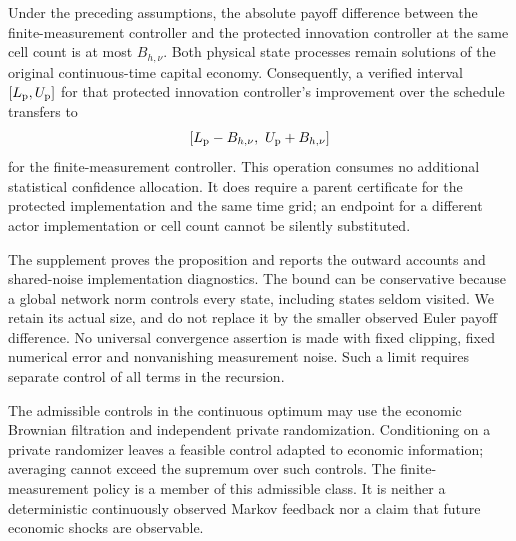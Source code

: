 \begin{proposition}\label{prop:r13sensor}
Under the preceding assumptions, the absolute payoff difference between the finite-measurement controller and the protected innovation controller at the same cell count is at most $B_{h,\nu}$. Both physical state processes remain solutions of the original continuous-time capital economy. Consequently, a verified interval $[L_{\rm p},U_{\rm p}]$ for that protected innovation controller's improvement over the schedule transfers to
\[
 [L_{\rm p}-B_{h,\nu},\ U_{\rm p}+B_{h,\nu}]
\]
for the finite-measurement controller. This operation consumes no additional statistical confidence allocation. It does require a parent certificate for the protected implementation and the same time grid; an endpoint for a different actor implementation or cell count cannot be silently substituted.
\end{proposition}

The supplement proves the proposition and reports the outward accounts and shared-noise implementation diagnostics. The bound can be conservative because a global network norm controls every state, including states seldom visited. We retain its actual size, and do not replace it by the smaller observed Euler payoff difference. No universal convergence assertion is made with fixed clipping, fixed numerical error and nonvanishing measurement noise. Such a limit requires separate control of all terms in the recursion.

The admissible controls in the continuous optimum may use the economic Brownian filtration and independent private randomization. Conditioning on a private randomizer leaves a feasible control adapted to economic information; averaging cannot exceed the supremum over such controls. The finite-measurement policy is a member of this admissible class. It is neither a deterministic continuously observed Markov feedback nor a claim that future economic shocks are observable.
